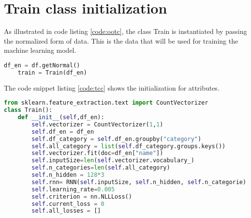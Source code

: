 \section{Train class initialization}
As illustrated in code listing \ref{code:ootc}, the class Train is instantiated by passing the normalized form of data. This is the data that will be used for training the machine learning model.
\begin{lstlisting}[language=Python,caption={Object of the Train class},label={code:ootc}]
    df_en = df.getNormal()
    train = Train(df_en)
\end{lstlisting}

The code snippet listing \ref{code:tcc} shows the initialization for attributes.
\begin{lstlisting}[language=Python,caption={Train class constructor},label={code:tcc}]
from sklearn.feature_extraction.text import CountVectorizer
class Train():
    def __init__(self,df_en):
        self.vectorizer = CountVectorizer(1,1)
        self.df_en = df_en
        self.df_category = self.df_en.groupby("category")
        self.all_category = list(self.df_category.groups.keys())
        self.vectorizer.fit(doc=df_en["name"])
        self.inputSize=len(self.vectorizer.vocabulary_)
        self.n_categories=len(self.all_category)
        self.n_hidden = 128*3
        self.rnn= RNN(self.inputSize, self.n_hidden, self.n_categorie)
        self.learning_rate=0.005
        self.criterion = nn.NLLLoss()
        self.current_loss = 0
        self.all_losses = []
\end{lstlisting}

